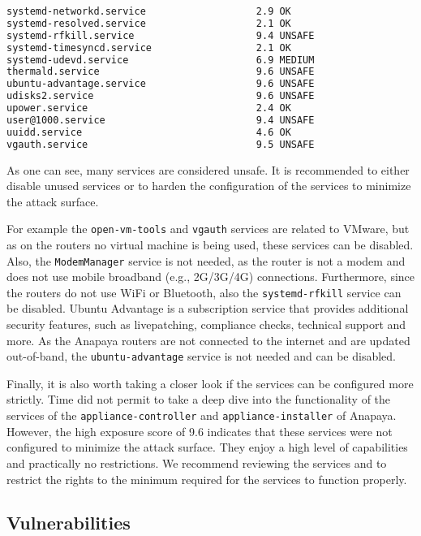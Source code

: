 \begin{lstlisting}[language=bash, deletekeywords={local}, numbers=none, caption={Output of \texttt{systemd-analyze security}}]
systemd-networkd.service                   2.9 OK        
systemd-resolved.service                   2.1 OK        
systemd-rfkill.service                     9.4 UNSAFE    
systemd-timesyncd.service                  2.1 OK        
systemd-udevd.service                      6.9 MEDIUM    
thermald.service                           9.6 UNSAFE    
ubuntu-advantage.service                   9.6 UNSAFE    
udisks2.service                            9.6 UNSAFE    
upower.service                             2.4 OK        
user@1000.service                          9.4 UNSAFE    
uuidd.service                              4.6 OK        
vgauth.service                             9.5 UNSAFE    
\end{lstlisting}

As one can see, many services are considered unsafe.
It is recommended to either disable unused services or to harden the configuration of the services to minimize the attack surface.

For example the \texttt{open-vm-tools} and \texttt{vgauth} services are related to VMware, but as on the routers no virtual machine is being used, these services can be disabled.
Also, the \texttt{ModemManager} service is not needed, as the router is not a modem and does not use mobile broadband (e.g., 2G/3G/4G) connections.
Furthermore, since the routers do not use WiFi or Bluetooth, also the \texttt{systemd-rfkill} service can be disabled.
Ubuntu Advantage is a subscription service that provides additional security features, such as livepatching, compliance checks, technical support and more.
As the Anapaya routers are not connected to the internet and are updated out-of-band, the \texttt{ubuntu-advantage} service is not needed and can be disabled.

Finally, it is also worth taking a closer look if the services can be configured more strictly.
Time did not permit to take a deep dive into the functionality of the services of the \texttt{appliance-controller} and \texttt{appliance-installer} of Anapaya.
However, the high exposure score of 9.6 indicates that these services were not configured to minimize the attack surface.
They enjoy a high level of capabilities and practically no restrictions.
We recommend reviewing the services and to restrict the rights to the minimum required for the services to function properly.


\subsection{Vulnerabilities}


